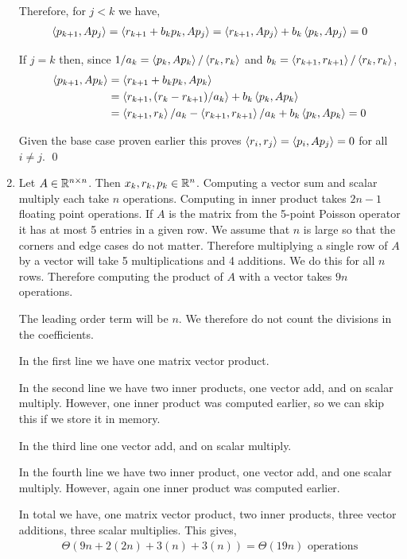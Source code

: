 \documentclass[10pt]{article}
\begin{document}
\begin{solution}[Solution]
\begin{enumerate}[label=(\alph*)]
        Therefore, for \( j < k \) we have,
        \begin{align*}
            \left\langle p_{k+1}, A p_j \right\rangle 
            = \left\langle r_{k+1} + b_kp_k, A p_j \right\rangle
            = \left\langle r_{k+1}, Ap_j \right\rangle + b_k \left\langle p_k,Ap_j \right\rangle
            = 0 
        \end{align*}

        If \( j = k \) then, since \( 1/a_k = \left\langle p_k,Ap_k \right\rangle/\left\langle r_k,r_k \right\rangle \) and \( b_k = \left\langle r_{k+1},r_{k+1} \right\rangle/\left\langle r_k,r_k \right\rangle \),
        \begin{align*}
            \left\langle p_{k+1},A p_k \right\rangle 
            &= \left\langle r_{k+1}+b_kp_k,Ap_k \right\rangle
            \\&= \left\langle r_{k+1},(r_k-r_{k+1})/a_k \right\rangle + b_k\left\langle p_k,Ap_k \right\rangle
            \\&= \left\langle r_{k+1},r_k \right\rangle/a_k - \left\langle r_{k+1},r_{k+1} \right\rangle/a_k + b_k\left\langle p_k,Ap_k \right\rangle
            = 0 
        \end{align*} 

        Given the base case proven earlier this proves \( \left\langle r_i,r_j \right\rangle = \left\langle p_i, Ap_j \right\rangle = 0 \) for all \( i\neq j \). \qed

    \item 
        Let \( A\in \mathbb{R}^{n\times n} \). Then \( x_k, r_k, p_k \in \mathbb{R}^n \). Computing a vector sum and scalar multiply each take \( n \) operations. Computing in inner product takes  \( 2n-1 \) floating point operations. If \( A \) is the matrix from the 5-point Poisson operator it has at most 5 entries in a given row. We assume that \( n \) is large so that the corners and edge cases do not matter. Therefore multiplying a single row of \( A \) by a vector will take 5 multiplications and 4 additions. We do this for all \( n \) rows. Therefore computing the product of \( A \) with a vector takes \( 9n \) operations.

The leading order term will be \( n \). We therefore do not count the divisions in the coefficients.

In the first line we have one matrix vector product.

In the second line we have two inner products, one vector add, and on scalar multiply.
However, one inner product was computed earlier, so we can skip this if we store it in memory.

In the third line one vector add, and on scalar multiply.

In the fourth line we have two inner product, one vector add, and one scalar multiply. 
However, again one inner product was computed earlier.

In total we have, one matrix vector product, two inner products, three vector additions, three scalar multiplies.
This gives,
\begin{align*}
    \Theta (9n + 2(2n) + 3(n) + 3(n)) = \Theta(19n) \text{ operations}
\end{align*}


\end{enumerate}
\end{solution}
\end{document}
